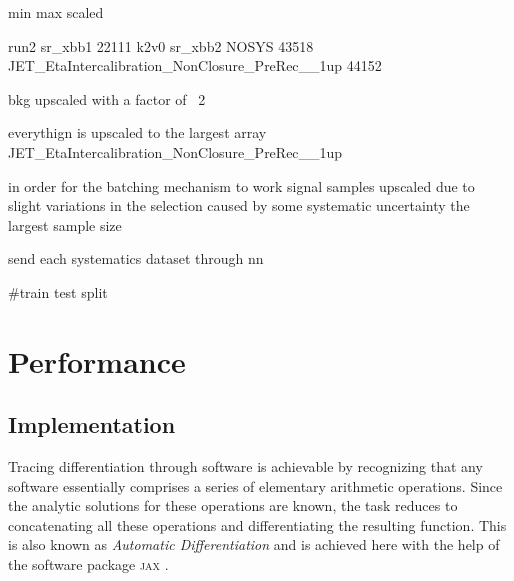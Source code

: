 min max scaled

run2 sr_xbb1
22111
k2v0 sr_xbb2
NOSYS
43518
JET_EtaIntercalibration_NonClosure_PreRec__1up
44152

bkg upscaled with a factor of ~2


everythign is upscaled to the largest array
JET_EtaIntercalibration_NonClosure_PreRec__1up


in order for the batching mechanism to work
signal samples upscaled due to slight variations in the selection caused by some systematic uncertainty the largest sample size


send each systematics dataset through nn

#train test split




\section{Performance}

\subsection{Implementation}
Tracing differentiation through software is achievable by recognizing that any software essentially comprises a series of elementary arithmetic operations. Since the analytic solutions for these operations are known, the task reduces to concatenating all these operations and differentiating the resulting function. This is also known as \textit{Automatic Differentiation} and is achieved here with the help of the software package \textsc{jax} \citep{jax2018github}.

